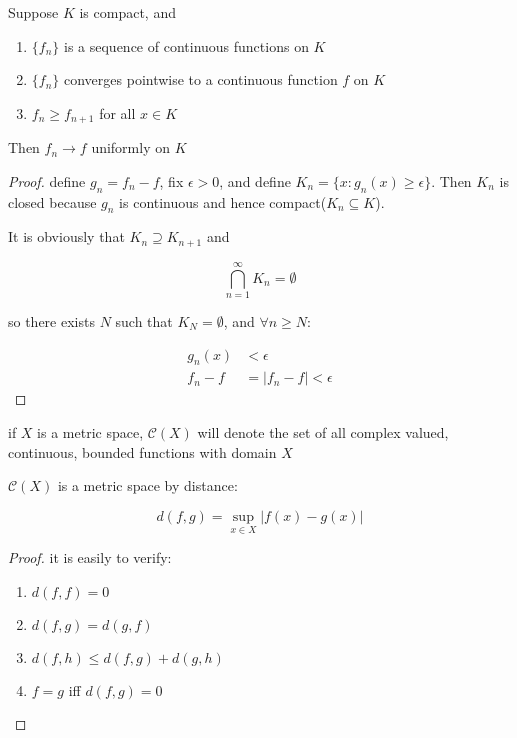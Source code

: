 \begin{thm}
    Suppose $K$ is compact, and 

    \begin{enumerate}
        \item $\{ f_n\}$ is a sequence of continuous functions on $K$

        \item $\{ f_n\}$ converges pointwise to a continuous function $f$ on $K$

        \item $f_n \ge f_{n+1}$ for all $x \in K$
    \end{enumerate}

    Then $f_n \to f$ uniformly on $K$
\end{thm}

\begin{proof}
    define $g_n = f_n -f$, fix $\epsilon > 0$, and define $K_n = \{ x: g_n(x) \ge \epsilon \}$. 
    Then $K_n$ is closed because $g_n$ is continuous and hence compact($K_n \subseteq K$). 

    It is obviously that $K_n \supseteq K_{n+1}$ and

    \[
        \bigcap_{n=1}^{\infty}K_n = \emptyset
    \]

    so there exists $N$ such that $K_N = \emptyset$, and $\forall n \ge N$:

    \begin{align*}
        g_n(x) &< \epsilon \\
        f_n -f  &= \left| f_n - f\right| < \epsilon
    \end{align*}

\end{proof}

\begin{definition}
    if $X$ is a metric space, $\mathscr{C}(X)$ will denote the set of all complex
    valued, continuous, bounded functions with domain $X$
\end{definition}

\begin{thm}
    $\mathscr{C}(X)$ is a  metric space by distance:

    \[
        d(f,g) = \sup_{x \in X} \left| f(x) - g(x) \right|
    \]
\end{thm}

\begin{proof}
    it is easily to verify:

    \begin{enumerate}
        \item $d(f,f) = 0$

        \item $d(f,g) = d(g,f)$

        \item $d(f,h) \le d(f,g) + d(g,h)$

        \item $f = g$ iff $d(f,g) = 0$
    \end{enumerate}
\end{proof}

